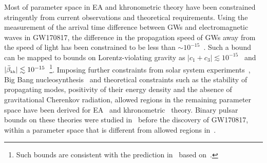 \documentclass[prd,twocolumn,nofootinbib]{revtex4-1}
\newcommand{\KG}{{\mbox{\tiny kh}}}
\begin{document}
Most of parameter space in EA and khronometric theory have been constrained stringently from current observations and theoretical requirements. Using the measurement of the arrival time difference between GWs and electromagnetic waves in GW170817, the difference in the propagation speed of GWs away from the speed of light has been constrained to be less than $\sim 10^{-15}$~\cite{TheLIGOScientific:2017qsa,Monitor:2017mdv}. Such a bound can be mapped to bounds on Lorentz-violating gravity as $|c_1 + c_3| \lesssim 10^{-15}$~\cite{Oost:2018tcv} and $|\bar{\beta}_{\KG} | \lesssim10^{-15}$~\cite{Gumrukcuoglu:2017ijh}\footnote{Such bounds are consistent with the prediction in~\cite{Hansen:2014ewa} based on~\cite{Nishizawa:2014zna}.}. Imposing further constraints from solar system experiments~\cite{Bailey:2006fd,Foster:2005dk,Will:2005va}, Big Bang nucleosynthesis~\cite{Audren:2013dwa} and theoretical constraints such as the stability of propagating modes, positivity of their energy density \cite{Eling:2005zq} and the absence of gravitational Cherenkov radiation\cite{Elliott:2005va},  allowed regions in the remaining parameter space have been derived for EA~\cite{Oost:2018tcv} and khronometric~\cite{Gumrukcuoglu:2017ijh} theory. Binary pulsar bounds on these theories were studied in~\cite{Yagi:2013ava,Yagi:2013qpa} before the discovery of GW170817, within a parameter space that is different from allowed regions in~\cite{Oost:2018tcv,Gumrukcuoglu:2017ijh}.

% 
 
\end{document}
